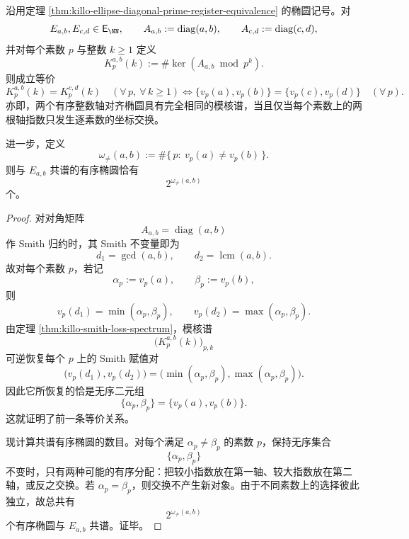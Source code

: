 \begin{theorem}\label{thm:xi-integer-ellipse-mod-kernel-spectrum-primewise-unordered}
沿用定理 \ref{thm:killo-ellipse-diagonal-prime-register-equivalence} 的椭圆记号。对
\[
E_{a,b},E_{c,d}\in \mathsf E_{\NN},
\qquad
A_{a,b}:=\operatorname{diag}(a,b),
\qquad
A_{c,d}:=\operatorname{diag}(c,d),
\]
并对每个素数 \(p\) 与整数 \(k\ge 1\) 定义
\[
K_p^{a,b}(k):=\#\ker(A_{a,b}\bmod p^k).
\]
则成立等价
\[
K_p^{a,b}(k)=K_p^{c,d}(k)\quad(\forall\,p,\ \forall\,k\ge 1)
\iff
\{v_p(a),v_p(b)\}=\{v_p(c),v_p(d)\}\quad(\forall\,p).
\]
亦即，两个有序整数轴对齐椭圆具有完全相同的模核谱，当且仅当每个素数上的两根轴指数只发生逐素数的坐标交换。

进一步，定义
\[
\omega_{\neq}(a,b):=\#\{\,p:\ v_p(a)\neq v_p(b)\,\}.
\]
则与 \(E_{a,b}\) 共谱的有序椭圆恰有
\[
2^{\omega_{\neq}(a,b)}
\]
个。
\end{theorem}
\begin{proof}
对对角矩阵
\[
A_{a,b}=\operatorname{diag}(a,b)
\]
作 Smith 归约时，其 Smith 不变量即为
\[
d_1=\gcd(a,b),
\qquad
d_2=\operatorname{lcm}(a,b).
\]
故对每个素数 \(p\)，若记
\[
\alpha_p:=v_p(a),
\qquad
\beta_p:=v_p(b),
\]
则
\[
v_p(d_1)=\min(\alpha_p,\beta_p),
\qquad
v_p(d_2)=\max(\alpha_p,\beta_p).
\]
由定理 \ref{thm:killo-smith-loss-spectrum}，模核谱
\[
\bigl(K_p^{a,b}(k)\bigr)_{p,k}
\]
可逆恢复每个 \(p\) 上的 Smith 赋值对
\[
\bigl(v_p(d_1),v_p(d_2)\bigr)
=
\bigl(\min(\alpha_p,\beta_p),\max(\alpha_p,\beta_p)\bigr).
\]
因此它所恢复的恰是无序二元组
\[
\{\alpha_p,\beta_p\}=\{v_p(a),v_p(b)\}.
\]
这就证明了前一条等价关系。

现计算共谱有序椭圆的数目。对每个满足 \(\alpha_p\neq \beta_p\) 的素数 \(p\)，保持无序集合
\[
\{\alpha_p,\beta_p\}
\]
不变时，只有两种可能的有序分配：把较小指数放在第一轴、较大指数放在第二轴，或反之交换。若 \(\alpha_p=\beta_p\)，则交换不产生新对象。由于不同素数上的选择彼此独立，故总共有
\[
2^{\omega_{\neq}(a,b)}
\]
个有序椭圆与 \(E_{a,b}\) 共谱。证毕。
\end{proof}


